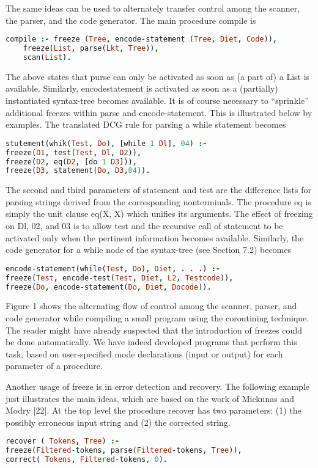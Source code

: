  The same ideas can be used to alternately transfer control among the scanner,
the parser, and the code generator. The main procedure compile is
\begin{lstlisting}[language=prolog]
compile :- freeze (Tree, encode-statement (Tree, Diet, Code)),
	freeze(List, parse(Lkt, Tree)),
	scan(List).
\end{lstlisting}
The above states that purse can only be activated as soon as (a part of) a List is
available. Similarly, encodestatement is activated as soon as a (partially) instantiated
syntax-tree becomes available. It is of course necessary to “sprinkle”
additional freezes within parse and encode-statement. This is illustrated below
by examples. The translated DCG rule for parsing a while statement becomes
\begin{lstlisting}[language=prolog]
stutement(whik(Test, Do), [while 1 Dl], 04) :-
freeze(D1, test(Test, Dl, D2)),
freeze(D2, eq(D2, [do 1 D3])),
freeze(D3, statement(Do, D3,04)).  
\end{lstlisting}
The second and third parameters of statement and test are the difference lists for
parsing strings derived from the corresponding nonterminals. The procedure eq
is simply the unit clause eq(X, X) which unifies its arguments. The effect of
freezing on Dl, 02, and 03 is to allow test and the recursive call of statement to
be activated only when the pertinent information becomes available. Similarly,
the code generator for a while node of the syntax-tree (see Section 7.2) becomes
\begin{lstlisting}[language=prolog]
encode-statement(while(Test, Do), Diet, . . .) :-
freeze(Test, encode-test(Test, Diet, L2, Testcode)),
freeze(Do, encode-statement(Do, Diet, Docode)). 
\end{lstlisting}

Figure 1 shows the alternating flow of control among the scanner, parser, and
code generator while compiling a small program using the coroutining technique.
The reader might have already suspected that the introduction of freezes could
be done automatically. We have indeed developed programs that perform this
task, based on user-specified mode declarations (input or output) for each
parameter of a procedure. 

Another usage of freeze is in error detection and recovery. The following
example just illustrates the main ideas, which are based on the work of Mickunas 
and Modry [22]. At the top level the procedure recover has two parameters:
(1) the possibly erroneous input string and (2) the corrected string.
\begin{lstlisting}[language=prolog]
recover ( Tokens, Tree) :-
freeze(Filtered-tokens, parse(Filtered-tokens, Tree)),
correct( Tokens, Filtered-tokens, 0). 
\end{lstlisting}

